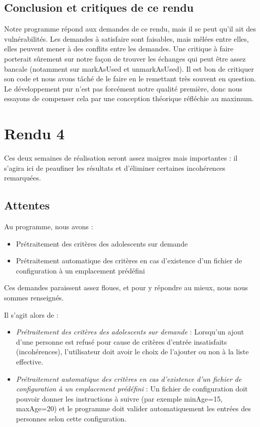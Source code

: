 \documentclass{mytex}
\begin{document}
\subsection{Conclusion et critiques de ce rendu}

Notre programme répond aux demandes de ce rendu, mais il se peut qu'il ait des vulnérabilités. Les demandes à satisfaire sont faisables, mais mêlées entre elles, elles peuvent mener à des conflits entre les demandes. Une critique à faire porterait sûrement sur notre façon de trouver les échanges qui peut être assez bancale (notamment sur markAsUsed et unmarkAsUsed). Il est bon de critiquer son code et nous avons tâché de le faire en le remettant très souvent en question. Le développement pur n'est pas forcément notre qualité première, donc nous essayons de compenser cela par une conception théorique réfléchie au maximum.

\section{Rendu 4}

Ces deux semaines de réalisation seront assez maigres mais importantes : il s'agira ici de peaufiner les résultats et d'éliminer certaines incohérences remarquées.


\subsection{Attentes}

Au programme, nous avons :

\begin{itemize}
	\item Prétraitement des critères des adolescents sur demande
	\item Prétraitement automatique des critères en cas d’existence d’un fichier de configuration à un emplacement prédéfini
\end{itemize}

Ces demandes paraissent assez floues, et pour y répondre au mieux, nous nous sommes renseignés.

Il s'agit alors de : 

\begin{itemize}
	\item \textit{Prétraitement des critères des adolescents sur demande} : Lorsqu'un ajout d'une personne est refusé pour cause de critères d'entrée insatisfaits (incohérences), l'utilisateur doit avoir le choix de l'ajouter ou non à la liste effective.
	\item \textit{Prétraitement automatique des critères en cas d’existence d’un fichier de configuration à un emplacement prédéfini} : Un fichier de configuration doit pouvoir donner les instructions à suivre (par exemple minAge=15, maxAge=20) et le programme doit valider automatiquement les entrées des personnes selon cette configuration.
\end{itemize}
\end{document}
